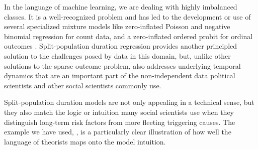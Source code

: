\documentclass[article]{jss}
\begin{document}
In the language of machine learning, we are dealing with highly
imbalanced classes. It is a well-recognized problem and has led to the
development or use of several specialized mixture models like
zero-inflated Poisson and negative binomial regression for count data,
and a zero-inflated ordered probit for ordinal outcomes \citep{bagozzi2015modeling}. Split-population duration regression provides another principled
solution to the challenges posed by data in this domain, but, unlike
other solutions to the sparse outcome problem, also addresses underlying
temporal dynamics that are an important part of the non-independent data
political scientists and other social scientists commonly use.

Split-population duration models are not only appealing in a technical
sense, but they also match the logic or intuition many social scientists
use when they distinguish long-term risk factors from more fleeting
triggering causes. The example we have used, \citet{belkin2003toward},
is a particularly clear illustration of how well the language of
theorists maps onto the model intuition.


\end{document}
